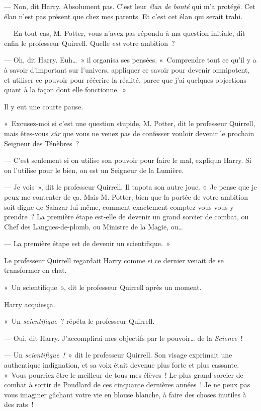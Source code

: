 --- Non, dit Harry. Absolument pas. C'est leur \emph{élan de bonté} qui m'a protégé. Cet élan n'est pas présent que chez mes parents. Et c'est cet élan qui serait trahi.

--- En tout cas, M. Potter, vous n'avez pas répondu à ma question initiale, dit enfin le professeur Quirrell. Quelle \emph{est} votre ambition~?

--- Oh, dit Harry. Euh…~» il organisa ses pensées. «~Comprendre tout ce qu'il y a à savoir d'important sur l'univers, appliquer ce savoir pour devenir omnipotent, et utiliser ce pouvoir pour réécrire la réalité, parce que j'ai quelques objections quant à la façon dont elle fonctionne.~»

Il y eut une courte pause.

«~Excusez-moi si c'est une question stupide, M. Potter, dit le professeur Quirrell, mais êtes-vous \emph{sûr} que vous ne venez pas de confesser vouloir devenir le prochain Seigneur des Ténèbres~?

--- C'est seulement si on utilise son pouvoir pour faire le mal, expliqua Harry. Si on l'utilise pour le bien, on est un Seigneur de la Lumière.

--- Je vois~», dit le professeur Quirrell. Il tapota son autre joue. «~Je pense que je peux me contenter de ça. Mais M. Potter, bien que la portée de votre ambition soit digne de Salazar lui-même, comment exactement comptez-vous vous y prendre~? La première étape est-elle de devenir un grand sorcier de combat, ou Chef des Langues-de-plomb, ou Ministre de la Magie, ou…

--- La première étape est de devenir un scientifique.~»

Le professeur Quirrell regardait Harry comme si ce dernier venait de se transformer en chat.

«~Un scientifique~», dit le professeur Quirrell après un moment.

Harry acquiesça.

«~Un \emph{scientifique}~? répéta le professeur Quirrell.

--- Oui, dit Harry. J'accomplirai mes objectifs par le pouvoir… de la \emph{Science}~!

--- Un \emph{scientifique~!}~» dit le professeur Quirrell. Son visage exprimait une authentique indignation, et sa voix était devenue plus forte et plus cassante. «~Vous pourriez être le meilleur de tous mes élèves~! Le plus grand sorcier de combat à sortir de Poudlard de ces cinquante dernières années~! Je ne peux pas vous imaginer gâchant votre vie en blouse blanche, à faire des choses inutiles à des rats~!

